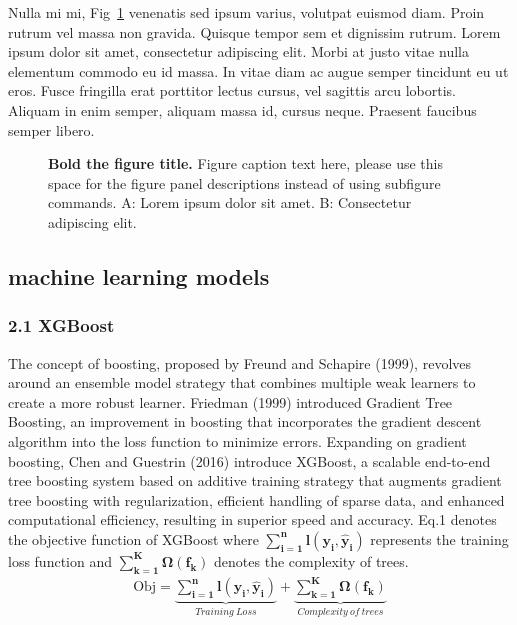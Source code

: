 \documentclass[10pt,letterpaper]{article}
\begin{document}
Nulla mi mi, Fig~\ref{fig1} venenatis sed ipsum varius, volutpat euismod diam. Proin rutrum vel massa non gravida. Quisque tempor sem et dignissim rutrum. Lorem ipsum dolor sit amet, consectetur adipiscing elit. Morbi at justo vitae nulla elementum commodo eu id massa. In vitae diam ac augue semper tincidunt eu ut eros. Fusce fringilla erat porttitor lectus cursus,  vel sagittis arcu lobortis. Aliquam in enim semper, aliquam massa id, cursus neque. Praesent faucibus semper libero.

\begin{figure}[!h]
\caption{{\bf Bold the figure title.}
Figure caption text here, please use this space for the figure panel descriptions instead of using subfigure commands. A: Lorem ipsum dolor sit amet. B: Consectetur adipiscing elit.}
\label{fig1}
\end{figure}

\subsection*{machine learning models}

\subsubsection*{2.1 XGBoost}
 The concept of boosting, proposed by Freund and Schapire (1999), revolves around an ensemble model strategy that combines multiple weak learners to create a more robust learner. Friedman (1999) introduced Gradient Tree Boosting, an improvement in boosting that incorporates the gradient descent algorithm into the loss function to minimize errors. Expanding on gradient boosting, Chen and Guestrin (2016) introduce XGBoost, a scalable end-to-end tree boosting system based on additive training strategy that augments gradient tree boosting with regularization, efficient handling of sparse data, and enhanced computational efficiency, resulting in superior speed and accuracy. Eq.1 denotes the objective function of XGBoost where \(\mathbf{\sum_{i=1}^{n}l(y_i,\hat{y}_i)}\) represents the training loss function and \(\mathbf{{\sum_{k=1}^{K}}\Omega(f_k)}\) denotes the complexity of trees.
\begin{eqnarray}
\label{eq:schemeP}
\mathrm{Obj}=\underbrace{\mathbf{\sum_{i=1}^{n}l(y_i,\hat{y}_i)}}_{Training \: Loss} +\underbrace{\mathbf{{\sum_{k=1}^{K}}\Omega(f_k)}}_{Complexity \: of \: trees}
\end{eqnarray}
\end{document}
